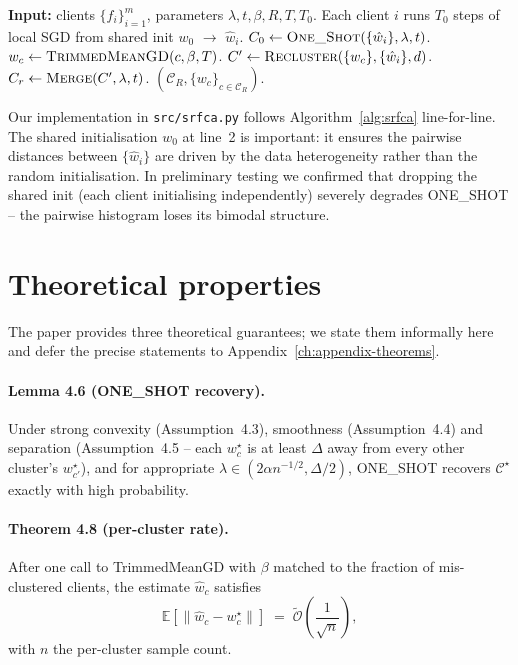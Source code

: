 \begin{algorithm}[h]
\caption{SR-FCA (Algorithm 1 of~\parencite{vardhan2024srfca}, re-stated)}\label{alg:srfca}
\begin{algorithmic}[1]
\State \textbf{Input:} clients $\{f_i\}_{i=1}^m$, parameters $\lambda, t, \beta, R, T, T_0$.
\State Each client $i$ runs $T_0$ steps of local SGD from shared init $w_0$ $\rightarrow$ $\hat{w}_i$.
\State $\mathcal{C}_0 \gets \textsc{One\_Shot}(\{\hat{w}_i\}, \lambda, t)$.
        \State $w_c \gets \textsc{TrimmedMeanGD}(c, \beta, T)$.
    \EndFor
    \State $\mathcal{C}' \gets \textsc{Recluster}(\{w_c\}, \{\hat{w}_i\}, d)$.
    \State $\mathcal{C}_r \gets \textsc{Merge}(\mathcal{C}', \lambda, t)$.
\EndFor
\State \Return $(\mathcal{C}_R, \{w_c\}_{c \in \mathcal{C}_R})$.
\end{algorithmic}
\end{algorithm}

Our implementation in \texttt{src/srfca.py} follows Algorithm~\ref{alg:srfca} line-for-line. The shared initialisation $w_0$ at line~2 is important: it ensures the pairwise distances between $\{\hat{w}_i\}$ are driven by the data heterogeneity rather than the random initialisation. In preliminary testing we confirmed that dropping the shared init (each client initialising independently) severely degrades ONE\_SHOT -- the pairwise histogram loses its bimodal structure.

\section{Theoretical properties}\label{sec:theory}

The paper provides three theoretical guarantees; we state them informally here and defer the precise statements to Appendix~\ref{ch:appendix-theorems}.

\paragraph{Lemma 4.6 (ONE\_SHOT recovery).} Under strong convexity (Assumption~4.3), smoothness (Assumption~4.4) and separation (Assumption~4.5 -- each $w_c^\star$ is at least $\Delta$ away from every other cluster's $w_{c'}^\star$), and for appropriate $\lambda \in (2\alpha n^{-1/2}, \Delta/2)$, ONE\_SHOT recovers $\mathcal{C}^\star$ exactly with high probability.

\paragraph{Theorem 4.8 (per-cluster rate).} After one call to TrimmedMeanGD with $\beta$ matched to the fraction of mis-clustered clients, the estimate $\hat{w}_c$ satisfies
\begin{equation}\label{eq:srfca-rate}
    \mathbb{E}\!\left[\lVert \hat{w}_c - w_c^\star \rVert\right] \;=\; \tilde{\mathcal{O}}\!\left(\frac{1}{\sqrt{n}}\right),
\end{equation}
with $n$ the per-cluster sample count.

